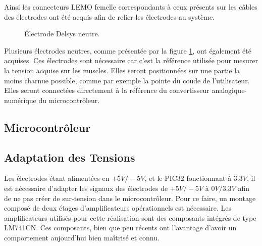 \documentclass[letterpaper, twoside, 12pt, memoire, creativecommons, hyperref]{thETS}
\begin{document}
Ainsi les connecteurs LEMO femelle correspondants à ceux présents sur les câbles des électrodes ont été acquis afin de relier les électrodes au système.

\begin{figure}
	\centering
	\caption{Électrode Delsys neutre.}
	\label{fig:delsysneutre}
\end{figure}

Plusieurs électrodes neutres, comme présentée par la figure \ref{fig:delsysneutre}, ont également été acquises. Ces électrodes sont nécessaire car c'est la référence utilisée pour mesurer la tension acquise sur les muscles. Elles seront positionnées sur une partie la moins charnue possible, comme par exemple la pointe du coude de l'utilisateur. Elles seront connectées directement à la référence du convertisseur analogique-numérique du microcontrôleur.

\subsection{Microcontrôleur}



\subsection{Adaptation des Tensions}

Les électrodes étant alimentées en $+5V/-5V$, et le PIC32 fonctionnant à $3.3V$, il est nécessaire d’adapter les signaux des électrodes de $+5V/-5V$ à $0V/3.3V$ afin de ne pas créer de sur-tension dans le microcontrôleur. Pour ce faire, un montage composé de deux étages d'amplificateurs opérationnels est nécessaire.  Les amplificateurs utilisés pour cette réalisation sont des composants intégrés de type LM741CN. Ces composants, bien que peu récents ont l'avantage d'avoir un comportement aujourd'hui bien maîtrisé et connu. 
\end{document}
